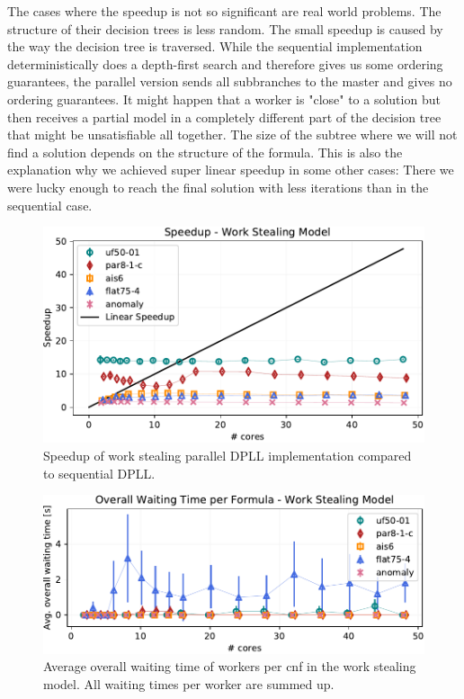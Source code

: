 \documentclass[letterpaper]{article}
\begin{document}
The cases where the speedup is not so significant are real world problems.
The structure of their decision trees is less random.
The small speedup is caused by the way the decision tree is traversed.
While the sequential implementation deterministically does a depth-first search and therefore gives us some ordering guarantees,
the parallel version sends all subbranches to the master and gives no ordering guarantees.
It might happen that a worker is "close" to a solution but then receives a partial model in a completely different part of the decision tree that might be unsatisfiable all together.
The size of the subtree where we will not find a solution depends on the structure of the formula.
This is also the explanation why we achieved super linear speedup in some other cases:
There we were lucky enough to reach the final solution with less iterations than in the sequential case.

\begin{figure}[p]
	\centering
	\includegraphics[width=\columnwidth]{figures/scaling_stealing_subset_dpll_scaling_tar.pdf}
	\caption{Speedup of work stealing parallel DPLL implementation compared to sequential DPLL.
		\label{fig:dpll_stealing_speedup}}
\end{figure}
\begin{figure}[p]
    \centering
    \includegraphics[width=\columnwidth]{figures/waiting_stealing_subset_dpll_scaling_tar.pdf}
    \caption{Average overall waiting time of workers per cnf in the work stealing model.
    All waiting times per worker are summed up.}
    \label{fig:dpll_stealing_waiting}
\end{figure}
\end{document}

